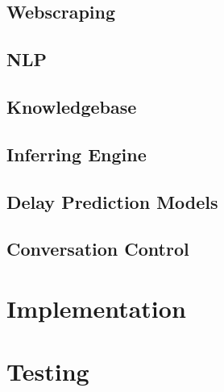 \documentclass[11pt]{article}
\begin{document}
\subsection{Webscraping} \label{webscraping}

\subsection{NLP} \label{nlp}

\subsection{Knowledgebase} \label{knowledgebase}

% 
\subsection{Inferring Engine} \label{inference-engine}

\subsection{Delay Prediction Models} \label{delay-prediction}

\subsection{Conversation Control} \label{conversation-control}

%

\section{Implementation} \label{implementation}

\section{Testing} \label{testing}
\end{document}
